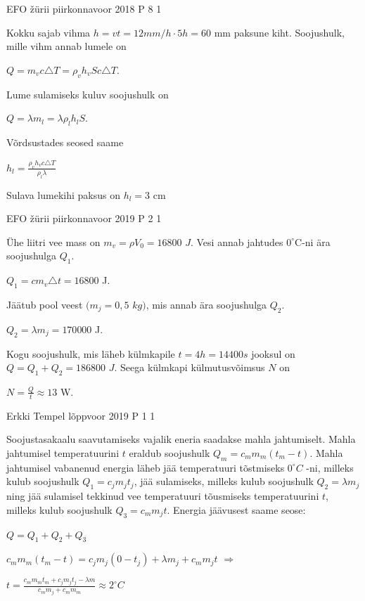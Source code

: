 \documentclass[11pt]{article}
\begin{document}
{%
{EFO žürii} %
{piirkonnavoor} %
{2018} %
{P 8} %
{1} %
{

\ifSolution
Kokku sajab vihma $h = vt = 12 mm/h \cdot 5h = 60$ mm paksune kiht. Soojushulk, mille vihm annab lumele on
\begin{center}
$Q = m_v c \triangle T = \rho_v h_v Sc \triangle T$.
\end{center}
Lume sulamiseks kuluv soojushulk on
\begin{center}
$Q = \lambda m_l = \lambda \rho_l h_l S$.
\end{center}
Võrdsustades seosed saame 
\begin{center}
$h_l = \frac{\rho_v h_v c \triangle T}{\rho_l \lambda}$
\end{center}
Sulava lumekihi paksus on $h_l = 3$ cm
\fi
}

{EFO žürii} %
{piirkonnavoor} %
{2019} %
{P 2} %
{1} %
{

\ifSolution
Ühe liitri vee mass on $m_v = \rho V_0 = 16800$ $J$. Vesi annab jahtudes $0^{\circ}$C-ni ära soojushulga $Q_1$.
\begin{center}
$Q_1 = cm_v \triangle t = 16800$ J.
\end{center}
Jäätub pool veest $(m_j = 0,5$ $kg)$, mis annab ära soojushulga $Q_2$.
\begin{center}
$Q_2 = \lambda m_j = 170 000$ J.
\end{center}
Kogu soojushulk, mis läheb külmkapile $t= 4h = 14 400s$ jooksul on $Q = Q_1 + Q_2 = 186 800$ $J$.
Seega külmkapi külmutusvõimsus $N$ on 
\begin{center}
$N=\frac{Q}{t} \approx 13$ W.
\end{center}
\fi
}

{Erkki Tempel} %
{lõppvoor} %
{2019} %
{P 1} %
{1} %
{

\ifSolution
Soojustasakaalu saavutamiseks vajalik eneria saadakse mahla jahtumiselt. Mahla jahtumisel temperatuurini $t$ eraldub soojushulk $Q_m = c_m m_m (t_m - t)$. Mahla jahtumisel vabanenud energia läheb jää temperatuuri tõstmiseks $0 ^{\circ}C$ -ni, milleks kulub soojushulk $Q_1 = c_j m_j t_j$, jää sulamiseks, milleks kulub soojushulk $Q_2 = \lambda m_j$ ning jää sulamisel tekkinud vee temperatuuri tõusmiseks temperatuurini $t$, milleks kulub soojushulk $Q_3 = c_m m_j t$. Energia jäävusest saame seose:
\begin{center}
$Q = Q_1 + Q_2 + Q_3$
\end{center}
\begin{center}
$c_m m_m(t_m - t) = c_j m_j(0 - t_j) + \lambda m_j + c_m m_j t$ $\Rightarrow$
\end{center}
\begin{center}
$t = \frac{c_m m_m t_m + c_j m_j t_j - \lambda m}{c_m m_j + c_m m_m} \approx 2 ^{\circ}C$
\end{center}
\fi
}

}
\end{document}
